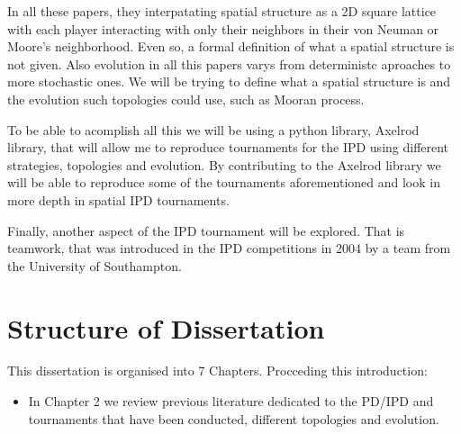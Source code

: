 In all these papers, they interpatating spatial structure as a 2D square lattice with
each player interacting with only their neighbors in their von Neuman or Moore's
neighborhood. Even so, a formal definition of what a spatial
structure is not given. Also evolution in all this papers varys from deterministc
aproaches to more stochastic ones. We will be trying to define what a spatial structure
is and the evolution such topologies could use, such as Mooran process.

To be able to acomplish all this we will be using a python library, Axelrod library,
that will allow me to reproduce tournaments for the IPD using different strategies,
topologies and evolution. By contributing to the Axelrod library we will be able
to reproduce some of the tournaments aforementioned and look in more depth in spatial
IPD tournaments.

Finally, another aspect of the IPD tournament will be explored. That is teamwork, that
was introduced in the IPD competitions in 2004 by a team from the University of Southampton.

\section{Structure of Dissertation}
This dissertation is organised into 7 Chapters. Procceding this introduction:
\begin{itemize}
  \item In Chapter 2 we review previous literature dedicated to the PD/IPD
        and tournaments that have been conducted, different topologies and evolution.
\end{itemize}
